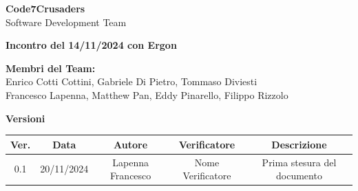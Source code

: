 \documentclass{article}
\begin{document}
\begin{titlepage}
    {\Huge \textbf{Code7Crusaders}}\\
    \vspace{0.5cm}
    {\Large Software Development Team}\\
    \vspace{2cm}
    
    {\large \textbf{Incontro del 14/11/2024 con Ergon}}\\ %
    \vspace{5cm}                           %
    
    
    \textbf{Membri del Team:}\\
    Enrico Cotti Cottini, Gabriele Di Pietro, Tommaso Diviesti \\
    Francesco Lapenna, Matthew Pan, Eddy Pinarello, Filippo Rizzolo \\
    \vspace{0.5cm}
    
    \vspace{1cm}
\end{titlepage}



\newpage
\begin{table}[h!]
\centering
\textbf{Versioni} \\ %
\vspace{2mm} %
\begin{tabular}{|c|c|c|c|c|}
    \hline
    \textbf{Ver.} & \textbf{Data} & \textbf{Autore} & \textbf{Verificatore} & \textbf{Descrizione} \\
    \hline
    0.1 & 20/11/2024 & Lapenna Francesco & Nome Verificatore & Prima stesura del documento \\ 
    \hline                                  %
\end{tabular}
\end{table}



\newpage
\tableofcontents
\end{document}
